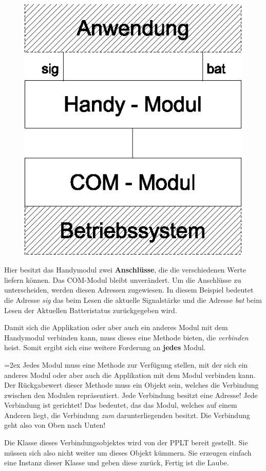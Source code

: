 \documentclass[a4paper,10pt]{book}
\newenvironment{merke}%
    {\begin{center}\bfseries\begin{Sbox}\begin{minipage}{10cm}\parskip=2ex}%
    {\end{minipage}\end{Sbox}\fbox{\TheSbox}\end{center}}
\begin{document}
    
    \begin{figure}
        \centering
        \includegraphics[scale=.8]{mod-tree2.eps}
        \caption{}
        \label{fig:mod_tree2}
    \end{figure}

    Hier besitzt das Handymodul zwei \textbf{Anschlüsse}, die
    die verschiedenen Werte liefern können. Das COM-Modul bleibt
    unverändert. Um die Anschlüsse zu unterscheiden, werden diesen Adressen
    zugewiesen. In diesem Beispiel bedeutet die Adresse \emph{sig} das beim 
    Lesen die aktuelle Signalstärke und die Adresse \emph{bat} beim Lesen
    der Aktuellen Batteristatus zurückgegeben wird.
    
    Damit sich die Applikation oder aber auch ein anderes Modul mit dem 
    Handymodul verbinden kann, muss dieses eine Methode bieten, die
    \emph{verbinden} heist. Somit ergibt sich eine weitere Forderung an
    \textbf{jedes} Modul.
    
    \begin{merke}
        Jedes Modul muss eine Methode zur Verfügung stellen, mit der sich
        ein anderes Modul oder aber auch die Applikation mit dem Modul
        verbinden kann. Der Rückgabewert dieser Methode muss ein Objekt
        sein, welches die Verbindung zwischen den Modulen repräsentiert.
        Jede Verbindung besitzt eine Adresse! Jede Verbindung ist gerichtet!
        Das bedeutet, das das Modul, welches auf einem Anderen liegt, die
        Verbindung \emph{zum} darunterliegenden besitzt. Die Verbindung geht
        also von Oben nach Unten! 
        
        Die Klasse dieses Verbindungsobjektes wird von der PPLT bereit gestellt.
        Sie müssen sich also nicht weiter um dieses Objekt kümmern. Sie 
        erzeugen einfach eine Instanz dieser Klasse und geben diese zurück, 
        Fertig ist die Laube.
    \end{merke}
    
\end{document}
